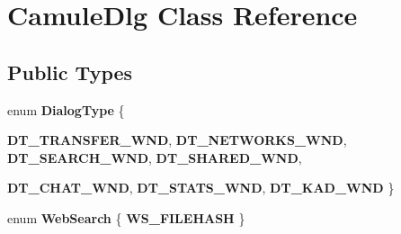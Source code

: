 \section{CamuleDlg Class Reference}
\label{classCamuleDlg}
\subsection*{Public Types}
\begin{DoxyCompactItemize}
\item 
enum {\bfseries DialogType} \{ \par
{\bfseries DT\_\-TRANSFER\_\-WND}, 
{\bfseries DT\_\-NETWORKS\_\-WND}, 
{\bfseries DT\_\-SEARCH\_\-WND}, 
{\bfseries DT\_\-SHARED\_\-WND}, 
\par
{\bfseries DT\_\-CHAT\_\-WND}, 
{\bfseries DT\_\-STATS\_\-WND}, 
{\bfseries DT\_\-KAD\_\-WND}
 \}
\item 
enum {\bf WebSearch} \{ {\bfseries WS\_\-FILEHASH}
 \}
\end{DoxyCompactItemize}
